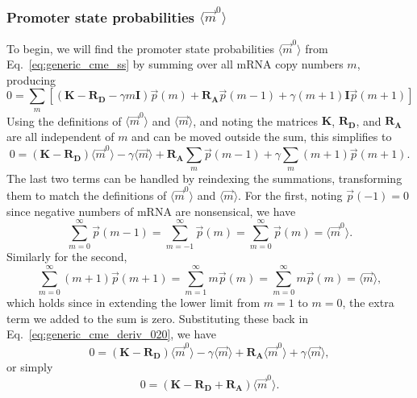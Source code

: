 \subsubsection{Promoter state probabilities $\langle\vec{m}^0\rangle$}
\label{sec:m0_appdx}
To begin, we will find the promoter state probabilities
$\langle\vec{m}^0\rangle$ from Eq.~\ref{eq:generic_cme_ss} by summing over all
mRNA copy numbers $m$, producing
\begin{equation}
0 = \sum_m \left[
    \left( \mathbf{K} - \mathbf{R_D} - \gamma m \mathbf{I} \right) \vec{p}(m)
                + \mathbf{R_A} \vec{p}(m-1) +
                \gamma (m+1) \mathbf{I} \vec{p}(m+1)
\right]
\end{equation}
Using the definitions of $\langle\vec{m}^0\rangle$ and $\langle\vec{m}\rangle$,
and noting the matrices $\mathbf{K}$, $\mathbf{R_D}$, and $\mathbf{R_A}$
are all independent of $m$ and can be moved outside the sum, this simplifies to
\begin{equation}
0 = (\mathbf{K} - \mathbf{R_D}) \langle\vec{m}^0\rangle
    - \gamma \langle\vec{m}\rangle + \mathbf{R_A} \sum_m \vec{p}(m-1)
    + \gamma \sum_m (m+1)\vec{p}(m+1).
\label{eq:generic_cme_deriv_020}
\end{equation}
The last two terms can be handled by reindexing the summations, transforming
them to match the definitions of $\langle\vec{m}^0\rangle$ and
$\langle\vec{m}\rangle$. For the first, noting $\vec{p}(-1)=0$ since negative
numbers of mRNA are nonsensical, we have
\begin{equation}
\sum_{m=0}^\infty \vec{p}(m-1)
= \sum_{m=-1}^\infty \vec{p}(m)
= \sum_{m=0}^\infty \vec{p}(m) = \langle\vec{m}^0\rangle.
\end{equation}
Similarly for the second,
\begin{equation}
\sum_{m=0}^\infty (m+1)\vec{p}(m+1)
= \sum_{m=1}^\infty m\vec{p}(m)
= \sum_{m=0}^\infty m\vec{p}(m) = \langle\vec{m}\rangle,
\end{equation}
which holds since in extending the lower limit from $m=1$ to $m=0$, the extra
term we added to the sum is zero. Substituting these back in
Eq.~\ref{eq:generic_cme_deriv_020}, we have
\begin{equation}
0 = (\mathbf{K} - \mathbf{R_D}) \langle\vec{m}^0\rangle
    - \gamma \langle\vec{m}\rangle + \mathbf{R_A} \langle\vec{m}^0\rangle
    + \gamma \langle\vec{m}\rangle,
\end{equation}
or simply
\begin{equation}
0 = (\mathbf{K} - \mathbf{R_D} + \mathbf{R_A}) \langle\vec{m}^0\rangle.
\label{eq:generic_cme_vecm0}
\end{equation}
